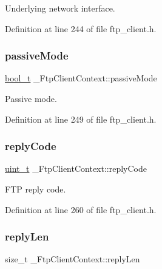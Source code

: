 Underlying network interface. 



Definition at line 244 of file ftp\+\_\+client.\+h.

\mbox{\label{struct__FtpClientContext_ad0aca9c411b2d5386de7689d178592fb}} 
\subsubsection{\texorpdfstring{passive\+Mode}{passiveMode}}
{\footnotesize\ttfamily \hyperlink{compiler__port_8h_a812d16e5494522586b3784e55d479912}{bool\+\_\+t} \+\_\+\+Ftp\+Client\+Context\+::passive\+Mode}



Passive mode. 



Definition at line 249 of file ftp\+\_\+client.\+h.

\mbox{\label{struct__FtpClientContext_a1aa9b36e0cad78e6d1ffbd5a8df433e8}} 
\subsubsection{\texorpdfstring{reply\+Code}{replyCode}}
{\footnotesize\ttfamily \hyperlink{compiler__port_8h_a12a1e9b3ce141648783a82445d02b58d}{uint\+\_\+t} \+\_\+\+Ftp\+Client\+Context\+::reply\+Code}



F\+TP reply code. 



Definition at line 260 of file ftp\+\_\+client.\+h.

\mbox{\label{struct__FtpClientContext_adcbb49bdeeeb6e961c6ea4d346e4e22b}} 
\subsubsection{\texorpdfstring{reply\+Len}{replyLen}}
{\footnotesize\ttfamily size\+\_\+t \+\_\+\+Ftp\+Client\+Context\+::reply\+Len}



